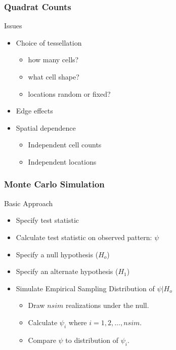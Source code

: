 \documentclass[nototal,handout]{beamer}
\begin{document}
\begin{frame}[<+->]
  \frametitle{Quadrat Counts}
  \begin{block}{Issues}
    \begin{itemize}
      \item Choice of tessellation
        \begin{itemize}
          \item how many cells?
          \item what cell shape?
          \item locations random or fixed?
        \end{itemize}
      \item Edge effects
      \item Spatial dependence
        \begin{itemize}
          \item Independent cell counts
          \item Independent locations
        \end{itemize}
    \end{itemize}
   \end{block}
 \end{frame}


\begin{frame}[<+->]
  \frametitle{Monte Carlo Simulation}
  \begin{block}{Basic Approach}
    \begin{itemize}
      \item Specify test statistic
      \item Calculate test statistic on observed pattern: $\psi$
      \item Specify a null hypothesis ($H_o$)
      \item Specify an alternate hypothesis ($H_1$)
      \item Simulate Empirical Sampling Distribution of $\psi|H_o$
	\begin{itemize}
	  \item Draw $nsim$ realizations under the null.
	  \item Calculate $\psi_i$ where $i=1,2,\ldots,nsim$.
	  \item Compare $\psi$ to distribution of $\psi_i$.
	\end{itemize}
    \end{itemize}
   \end{block}
 \end{frame}
\end{document}
